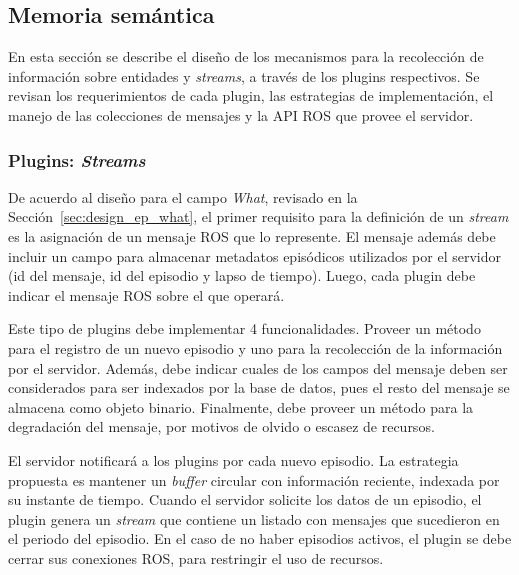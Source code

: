 \subsection{Memoria semántica}\label{sec:design_server_semantic_plugins}

En esta sección se describe el diseño de los mecanismos para la recolección de información sobre entidades y \textit{streams}, a través de los plugins respectivos. Se revisan los requerimientos de cada plugin, las estrategias de implementación, el manejo de las colecciones de mensajes y la API ROS que provee el servidor.


\subsubsection{Plugins: \textit{Streams}}

De acuerdo al diseño para el campo \textit{What}, revisado en la Sección~\ref{sec:design_ep_what}, el primer requisito para la definición de un \textit{stream} es la asignación de un mensaje ROS que lo represente. El mensaje además debe incluir un campo para almacenar metadatos episódicos utilizados por el servidor (id del mensaje, id del episodio y lapso de tiempo). Luego, cada plugin debe indicar el mensaje ROS sobre el que operará.

Este tipo de plugins debe implementar 4 funcionalidades. Proveer un método para el registro de un nuevo episodio y uno para la recolección de la información por el servidor. Además, debe indicar cuales de los campos del mensaje deben ser considerados para ser indexados por la base de datos, pues el resto del mensaje se almacena como objeto binario. Finalmente, debe proveer un método para la degradación del mensaje, por motivos de olvido o escasez de recursos.

El servidor notificará a los plugins por cada nuevo episodio. La estrategia propuesta es mantener un \textit{buffer} circular con información reciente, indexada por su instante de tiempo. Cuando el servidor solicite los datos de un episodio, el plugin genera un \textit{stream} que contiene un listado con mensajes que sucedieron en el periodo del episodio. En el caso de no haber episodios activos, el plugin se debe cerrar sus conexiones ROS, para restringir el uso de recursos.

